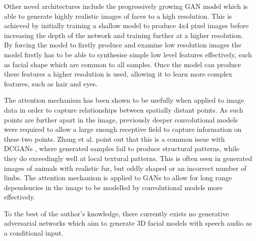 Other novel architectures include the progressively growing GAN model \cite{Karras2017b} which is able to generate highly realistic images of faces to a high resolution.
This is achieved by initially training a shallow model to produce 4x4 pixel images before increasing the depth of the network and training further at a higher resolution.
By forcing the model to firstly produce and examine low resolution images the model firstly has to be able to synthesise simple low level features effectively, such as facial shape which are common to all samples.
Once the model can produce these features a higher resolution is used, allowing it to learn more complex features, such as hair and eyes.

The attention mechanism \cite{Vaswani2017} has been shown to be usefully when applied to image data \cite{Xu2015} in order to capture relationships between spatially distant points.
As such points are further apart in the image, previously deeper convolutional models were required to allow a large enough receptive field to capture information on these two points.
Zhang et al. point out that this is a common issue with DCGANs \cite{Radford2016}, where generated samples fail to produce structural patterns, while they do exceedingly well at local textural patterns.
This is often seen in generated images of animals with realistic fur, but oddly shaped or an incorrect number of limbs.
The attention mechanism is applied to GANs \cite{Zhang2018} to allow for long range dependencies in the image to be modelled by convolutional models more effectively.

To the best of the author's knowledge, there currently exists no generative adversarial networks which aim to generate 3D facial models with speech audio as a conditional input.

%
%
%